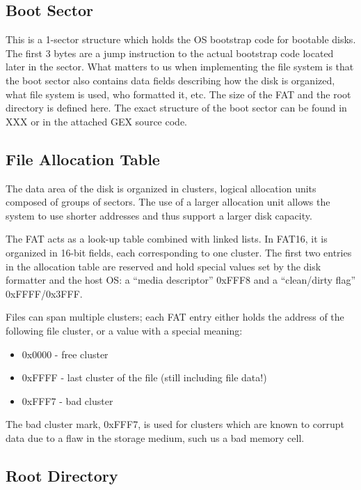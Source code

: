 \subsection{Boot Sector}

This is a 1-sector structure which holds the \gls{OS} bootstrap code for bootable disks. The first 3 bytes are a jump instruction to the actual bootstrap code located later in the sector. What matters to us when implementing the file system is that the boot sector also contains data fields describing how the disk is organized, what file system is used, who formatted it, etc. The size of the \gls{FAT} and the root directory is defined here. The exact structure of the boot sector can be found in XXX or in the attached GEX source code.

\subsection{File Allocation Table}

The data area of the disk is organized in clusters, logical allocation units composed of groups of sectors. The use of a larger allocation unit allows the system to use shorter addresses and thus support a larger disk capacity.

The \gls{FAT} acts as a look-up table combined with linked lists. In FAT16, it is organized in 16-bit fields, each corresponding to one cluster. The first two entries in the allocation table are reserved and hold special values set by the disk formatter and the host \gls{OS}: a ``media descriptor'' 0xFFF8 and a ``clean/dirty flag'' 0xFFFF/0x3FFF.

Files can span multiple clusters; each \gls{FAT} entry either holds the address of the following file cluster, or a value with a special meaning:

\begin{itemize}
	\item 0x0000 - free cluster
	\item 0xFFFF - last cluster of the file (still including file data!)
	\item 0xFFF7 - bad cluster
\end{itemize}

The bad cluster mark, 0xFFF7, is used for clusters which are known to corrupt data due to a flaw in the storage medium, such us a bad memory cell.

\subsection{Root Directory}

